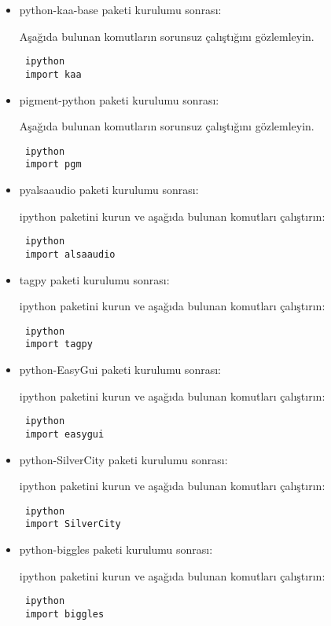 \documentclass[a4paper,10pt]{article}
\begin{document}
\begin{itemize}
\item python-kaa-base paketi kurulumu sonrası:

Aşağıda bulunan komutların sorunsuz çalıştığını gözlemleyin.

\begin{verbatim}
 ipython
 import kaa
\end{verbatim}

\item pigment-python paketi kurulumu sonrası:

Aşağıda bulunan komutların sorunsuz çalıştığını gözlemleyin.

\begin{verbatim}
 ipython
 import pgm
\end{verbatim}

\item pyalsaaudio paketi kurulumu sonrası:

ipython paketini kurun ve aşağıda bulunan komutları çalıştırın:
\begin{verbatim}
 ipython
 import alsaaudio
\end{verbatim}

\item tagpy paketi kurulumu sonrası:

ipython paketini kurun ve aşağıda bulunan komutları çalıştırın:
\begin{verbatim}
 ipython
 import tagpy
\end{verbatim}

\item python-EasyGui paketi kurulumu sonrası:

ipython paketini kurun ve aşağıda bulunan komutları çalıştırın:
\begin{verbatim}
 ipython
 import easygui
\end{verbatim}

\item python-SilverCity paketi kurulumu sonrası:

ipython paketini kurun ve aşağıda bulunan komutları çalıştırın:
\begin{verbatim}
 ipython
 import SilverCity
\end{verbatim}

\item python-biggles paketi kurulumu sonrası:

ipython paketini kurun ve aşağıda bulunan komutları çalıştırın:
\begin{verbatim}
 ipython
 import biggles
\end{verbatim}


\end{itemize}
\end{document}
